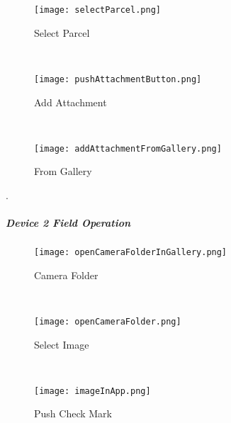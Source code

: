 \begin{wrapfigure}{r}{0.4\textwidth}
\centering
    \texttt{[image: selectParcel.png]}
\caption {Select Parcel}
\vspace{.05in}

\HRule \\[.4cm] %
\vspace{.1in}

    \texttt{[image: pushAttachmentButton.png]}
\caption{Add Attachment}
\vspace{.05in}

\HRule \\[.4cm] %
\vspace{.1in}

    \texttt{[image: addAttachmentFromGallery.png]}
\caption{From Gallery}
\end{wrapfigure}

.

\vspace{.5in}

\vspace{3in}

\vspace{3in}

\clearpage
\subparagraph*{Device 2 Field Operation}
\begin{wrapfigure}{r}{0.4\textwidth}
\centering
    \texttt{[image: openCameraFolderInGallery.png]}
\vspace{-.1in}

\caption {Camera Folder}
\vspace{.05in}

\HRule \\[.4cm] %
\vspace{.05in}

    \texttt{[image: openCameraFolder.png]}
\vspace{-.1in}

\caption{Select Image}
\vspace{.1in}

\HRule \\[.4cm] %
\vspace{.05in}

    \texttt{[image: imageInApp.png]}
\vspace{-.1in}

\caption{Push Check Mark}
\end{wrapfigure}

